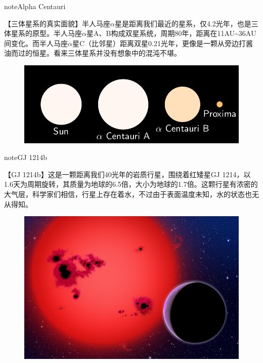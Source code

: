 \documentclass[letterpaper,10pt,english]{sphinxmanual}
\begin{document}
\begin{notice}{note}{Alpha Centauri}

【三体星系的真实面貌】半人马座\(\alpha\)星是距离我们最近的星系，仅4.2光年，也是三体星系的原型。半人马座\(\alpha\)星A、B构成双星系统，周期80年，距离在11AU\textasciitilde{}36AU间变化。而半人马座\(\alpha\)星C（比邻星）距离双星0.21光年，更像是一颗从旁边打酱油而过的恒星。看来三体星系并没有想象中的混沌不堪。
\begin{figure}[htbp]
\centering

\includegraphics{800px-Alpha_Centauri_relative_sizes.svg.png}
\end{figure}
\end{notice}

\begin{notice}{note}{GJ 1214b}

【GJ 1214b】这是一颗距离我们40光年的岩质行星，围绕着红矮星GJ 1214，以1.6天为周期旋转，其质量为地球的6.5倍，大小为地球的1.7倍。这颗行星有浓密的大气层，科学家们相信，行星上存在着水，不过由于表面温度未知，水的状态也无从得知。
\begin{figure}[htbp]
\centering

\includegraphics{gj-1214b.jpg}
\end{figure}
\end{notice}
\end{document}
